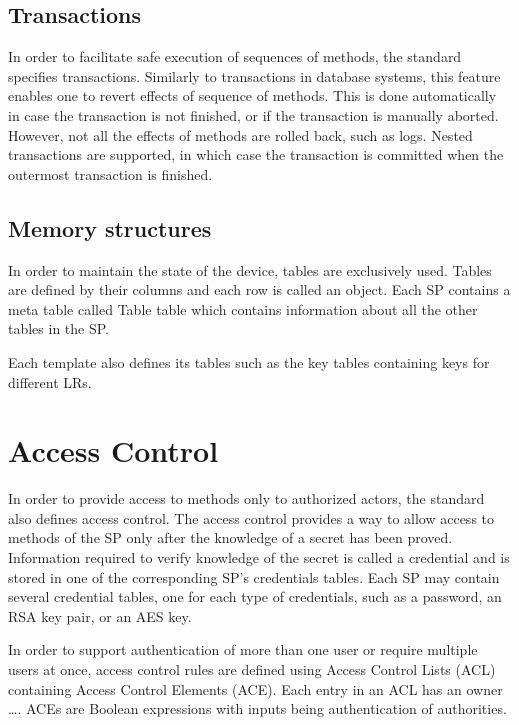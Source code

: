 

\subsection{Transactions}

In order to facilitate safe execution of sequences of methods, the standard specifies transactions. Similarly to transactions in database systems, this feature enables one to revert effects of sequence of methods. This is done automatically in case the transaction is not finished, or if the transaction is manually aborted. However, not all the effects of methods are rolled back, such as logs. Nested transactions are supported, in which case the transaction is committed when the outermost transaction is finished.

\subsection{Memory structures}

In order to maintain the state of the device, tables are exclusively used. Tables are defined by their columns and each row is called an object.
Each SP contains a meta table called Table table which contains information about all the other tables in the SP.

Each template also defines its tables such as the key tables containing keys for different LRs.


\section{Access Control}

In order to provide access to methods only to authorized actors, the standard also defines access control. The access control provides a way to allow access to methods of the SP only after the knowledge of a secret has been proved. Information required to verify knowledge of the secret is called a credential and is stored in one of the corresponding SP's credentials tables. Each SP may contain several credential tables, one for each type of credentials, such as a password,  an RSA key pair, or an AES key.

In order to support authentication of more than one user or require multiple users at once, access control rules are defined using Access Control Lists (ACL) containing Access Control Elements (ACE). Each entry in an ACL has an owner \dots. ACEs are Boolean expressions with inputs being authentication of authorities.

